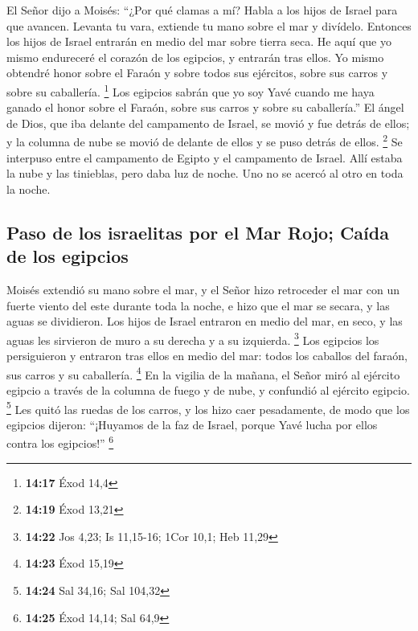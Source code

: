  El Señor dijo a Moisés: ``¿Por qué clamas a mí? Habla a
los hijos de Israel para que avancen.  Levanta tu vara,
extiende tu mano sobre el mar y divídelo. Entonces los hijos de Israel
entrarán en medio del mar sobre tierra seca.  He aquí que
yo mismo endureceré el corazón de los egipcios, y entrarán tras ellos.
Yo mismo obtendré honor sobre el Faraón y sobre todos sus ejércitos,
sobre sus carros y sobre su caballería. \footnote{\textbf{14:17} Éxod
  14,4}  Los egipcios sabrán que yo soy Yavé cuando me
haya ganado el honor sobre el Faraón, sobre sus carros y sobre su
caballería.''  El ángel de Dios, que iba delante del
campamento de Israel, se movió y fue detrás de ellos; y la columna de
nube se movió de delante de ellos y se puso detrás de ellos. \footnote{\textbf{14:19}
  Éxod 13,21}  Se interpuso entre el campamento de Egipto
y el campamento de Israel. Allí estaba la nube y las tinieblas, pero
daba luz de noche. Uno no se acercó al otro en toda la noche.

\hypertarget{paso-de-los-israelitas-por-el-mar-rojo-cauxedda-de-los-egipcios}{%
\subsection{Paso de los israelitas por el Mar Rojo; Caída de los
egipcios}\label{paso-de-los-israelitas-por-el-mar-rojo-cauxedda-de-los-egipcios}}

 Moisés extendió su mano sobre el mar, y el Señor hizo
retroceder el mar con un fuerte viento del este durante toda la noche, e
hizo que el mar se secara, y las aguas se dividieron. 
Los hijos de Israel entraron en medio del mar, en seco, y las aguas les
sirvieron de muro a su derecha y a su izquierda. \footnote{\textbf{14:22}
  Jos 4,23; Is 11,15-16; 1Cor 10,1; Heb 11,29}  Los
egipcios los persiguieron y entraron tras ellos en medio del mar: todos
los caballos del faraón, sus carros y su caballería. \footnote{\textbf{14:23}
  Éxod 15,19}  En la vigilia de la mañana, el Señor miró
al ejército egipcio a través de la columna de fuego y de nube, y
confundió al ejército egipcio. \footnote{\textbf{14:24} Sal 34,16; Sal
  104,32}  Les quitó las ruedas de los carros, y los hizo
caer pesadamente, de modo que los egipcios dijeron: ``¡Huyamos de la faz
de Israel, porque Yavé lucha por ellos contra los egipcios!''
\footnote{\textbf{14:25} Éxod 14,14; Sal 64,9}

